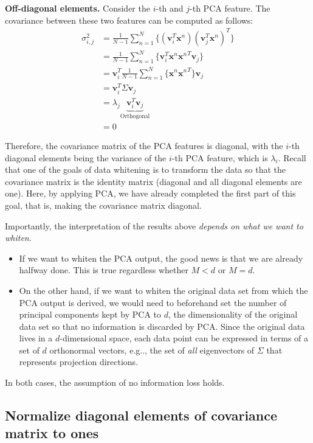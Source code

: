 \documentclass{article}
\newcommand{\vecv}{\boldsymbol{v}}
\newcommand{\vecx}{\boldsymbol{x}}
\begin{document}
\textbf{Off-diagonal elements.} Consider the $i$-th and $j$-th PCA feature. The covariance between these two features can be computed as follows:
\begin{align*}
\sigma_{i, j}^2 &= \frac{1}{N-1} \sum_{n=1}^N \{ (\vecv_i^T \vecx^n) (\vecv_j^T \vecx^n)^T \}\\
&=  \frac{1}{N-1} \sum_{n=1}^N \{ \vecv_i^T \vecx^n {\vecx^n}^T \vecv_j \} \\
&=  \vecv_i^T \frac{1}{N-1} \sum_{n=1}^N \{  \vecx^n {\vecx^n}^T \} \vecv_j \\
&=  \vecv_i^T \Sigma \vecv_j \\
&=  \lambda_j  \underbrace{\vecv_i^T \vecv_j}_{\text{Orthogonal}} \\
&= 0
\end{align*}

Therefore, the covariance matrix of the PCA features is diagonal, with the $i$-th diagonal elements being the variance of the $i$-th PCA feature, which is $\lambda_i$. Recall that one of the goals of data whitening is to transform the data so that the covariance matrix is the identity matrix (diagonal and all diagonal elements are one). Here, by applying PCA, we have already completed the first part of this goal, that is, making the covariance matrix diagonal. 

\vspace{3mm}
Importantly, the interpretation of the results above \textit{depends on what we want to whiten}. 
\begin{itemize}

	\item If we want to whiten the PCA output, the good news is that we are already halfway done. This is true regardless whether $M < d$ or $M = d$.

	\item  On the other hand, if we want to whiten the original data set from which the PCA output is derived, we would need to beforehand set the number of principal components kept by PCA to $d$, the dimensionality of the original data set so that no information is discarded by PCA. Since the original data lives in a $d$-dimensional space, each data point can be expressed in terms of a set of $d$ orthonormal vectors, e.g.., the set of \textit{all} eigenvectors of $\Sigma$ that represents projection directions.
	
\end{itemize}
In both cases, the assumption of no information loss holds. 

\subsection{Normalize diagonal elements of covariance matrix to ones}
\end{document}
